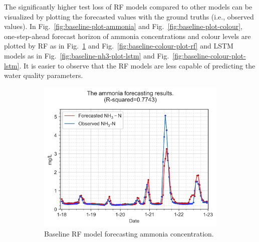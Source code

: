 The significantly higher test loss of RF models compared to other models can be visualized by plotting the forecasted values with the ground truths (i.e., observed values). In Fig.~\ref{fig:baseline-plot-ammonia} and Fig.~\ref{fig:baseline-plot-colour}, one-step-ahead forecast horizon of ammonia concentrations and colour levels are plotted by RF as in Fig.~\ref{fig:baseline-nh3-plot-rf} and Fig.~\ref{fig:baseline-colour-plot-rf} and LSTM models as in Fig.~\ref{fig:baseline-nh3-plot-lstm} and Fig.~\ref{fig:baseline-colour-plot-lstm}. It is easier to observe that the RF models are less capable of predicting the water quality parameters. 


\begin{figure}[!ht]
    \centering
    \begin{subfigure}[t]{0.75\textwidth}
      \includegraphics[width=\linewidth]{imgs/results/ammonia-colour-forecast-plot/00-RF_1_pred_Step1-obs-nh3.png}
      \caption{Baseline RF model forecasting ammonia concentration.} \label{fig:baseline-nh3-plot-rf}
    \end{subfigure}\\
    \vspace{1em}%
    \begin{subfigure}[t]{0.75\textwidth}

\end{subfigure}
\end{figure}
